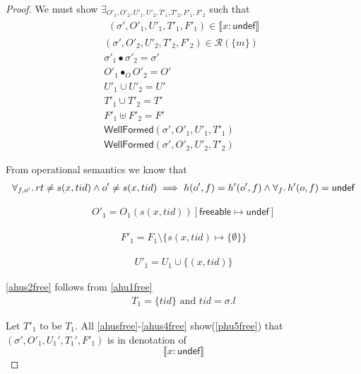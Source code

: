 \begin{proof}
We must show $\exists_{O'_{1}, O'_{2}, U'_{1}, U'_{2}, T'_{1}, T'_{2},F'_1, F'_2}$ such that
\begin{gather}\label{phu5free}
\begin{aligned}
(\sigma',O'_{1},U'_{1}, T'_{1},F'_1)  \in \llbracket  x:\textsf{undef}  \rrbracket 
\end{aligned}\\
\label{phu6free}
(\sigma',O'_{2},U'_{2}, T'_{2},F'_2) \in \mathcal{R}(\{m\})
\\
\label{phufreesig}
\sigma'_1 \bullet \sigma'_2 = \sigma'
\\
\label{phu7free}
O'_{1} \bullet_{O} O'_{2} = O'
\\
\label{phu8free}
U'_{1} \cup U'_{2} = U'
\\
\label{phu9free}
T'_{1} \cup T'_{2} = T'
\\
\label{phufreeF}
F'_1 \uplus F'_2 = F'
\\
\label{phu10free}
\textsf{WellFormed}(\sigma',O'_{1},U'_{1},T'_{1}) \\
\label{phu11free}
\textsf{WellFormed}(\sigma',O'_{2},U'_{2},T'_{2})
\end{gather}

From operational semantics we know that
\begin{gather}\label{ahusfree}
  \forall_{f,o'}\ldotp rt \neq s(x,tid) \land  o' \neq s(x,tid) \implies h(o',f) = h'(o',f) \land \forall_{f}\ldotp h'(o,f)=\textsf{undef}
\end{gather}

\begin{gather}\label{ahus1free}
  O'_1 =  O_1(s(x,tid))[\textsf{freeable}\mapsto \textsf{undef}]
\end{gather}

\begin{gather}\label{ahus3free}
  F'_1 = F_1 \setminus \{s(x,tid)\mapsto \{\emptyset\}\}
  \end{gather}

\begin{gather}\label{ahus4free}
  U'_1 = U_1 \cup \{(x,tid)\}
  \end{gather}

\ref{ahus2free} follows from \ref{ahu1free}
\begin{gather}\label{ahus2free}
  T_1 = \{tid\} \text{ and } tid = \sigma.l
\end{gather}

Let $T'_1$ to be $T_1$. All \ref{ahusfree}-\ref{ahus4free} show(\ref{phu5free}) that $(\sigma',O'_1,U_1',T_1',F'_1)$ is in denotation of  
\[\llbracket  x:\textsf{undef}  \rrbracket \]


\end{proof}
